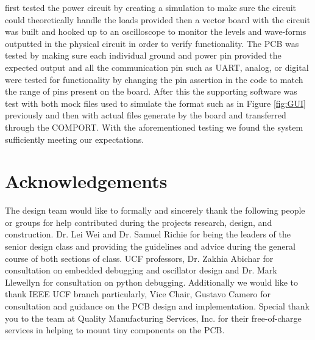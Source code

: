 \documentclass[comsoc, 12pt]{IEEEtran}
\begin{document}
first tested the power circuit by creating a simulation to make sure the circuit could theoretically handle the loads provided then a vector board with the circuit was built and hooked up to an oscilloscope to monitor the levels and wave-forms outputted in the physical circuit in order to verify functionality. The PCB was tested by making sure each individual ground and power pin provided the expected output and all the communication pin such as UART, analog, or digital were tested for functionality by changing the pin assertion in the code to match the range of pins present on the board. After this the supporting software was test with both mock files used to simulate the format such as in Figure \ref{fig:GUI} previously and then with actual files generate by the board and transferred through the COMPORT. With the aforementioned testing we found the system sufficiently meeting our expectations.    

\section{Acknowledgements}
\par The design team would like to formally and sincerely thank the following people or groups for help contributed during the projects research, design, and construction. Dr. Lei Wei and Dr. Samuel Richie for being the leaders of the senior design class and providing the guidelines and advice during the general course of both sections of class. UCF professors, Dr. Zakhia Abichar for consultation on embedded debugging and oscillator design and Dr. Mark Llewellyn for consultation on python debugging. Additionally we would like to thank IEEE UCF branch particularly, Vice Chair, Gustavo Camero for consultation and guidance on the PCB design and implementation. Special thank you to the team at Quality Manufacturing Services, Inc. for their free-of-charge services in helping to mount tiny components on the PCB. 
\end{document}
